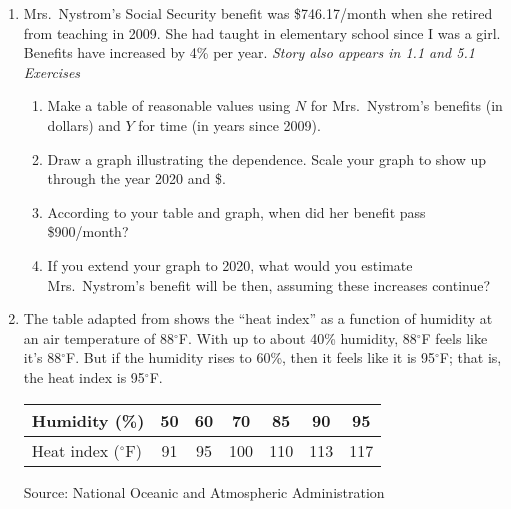 \begin{enumerate}
\item Mrs.\ Nystrom's Social Security benefit was \$746.17/month when she retired from teaching in 2009. She had taught in elementary school since I was a girl.   Benefits have increased by 4\% per year.  \hfill \emph{Story also appears in 1.1 and 5.1 Exercises}
\begin{enumerate}
\item Make a table of reasonable values using $N$ for Mrs.\ Nystrom's benefits (in dollars) and $Y$ for time (in years since 2009).  
\item Draw a graph illustrating the dependence.  Scale your graph to show up through the year 2020 and \$.
\item According to your table and graph, when did her benefit pass \$900/month?
\item If you extend your graph to 2020, what would you estimate Mrs.\ Nystrom's benefit will be then, assuming these increases continue?
\end{enumerate}  

\item The table adapted from shows the ``heat index'' as a function of humidity at an air temperature of 88$^\circ$F. With up to about 40\% humidity, 88$^\circ$F feels like it's 88$^\circ$F. But if the humidity rises to 60\%, then it feels like it is 95$^\circ$F;  that is, the heat index is 95$^\circ$F.  
\begin{center}
\begin{tabular} {|l| |c|c|c|c|c|c|} \hline
Humidity (\%)  & 50 & 60 & 70 & 85 & 90 & 95 \\ \hline
Heat index ($^\circ$F)  & 91 & 95 & 100 & 110 & 113 & 117 \\ \hline
\end{tabular}
\end{center}
\hfill \begin{footnotesize} Source:  National Oceanic and Atmospheric Administration  \end{footnotesize}


\end{enumerate}
